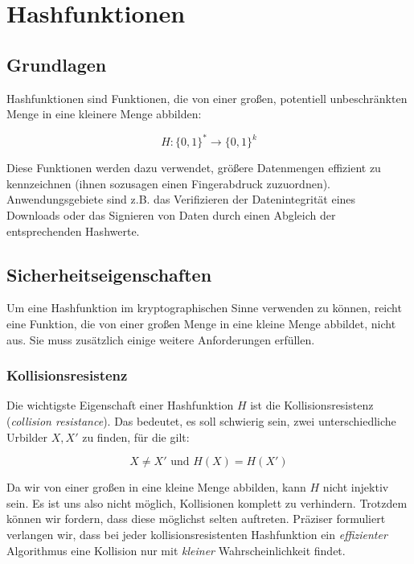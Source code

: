 \chapter{Hashfunktionen}

\section{Grundlagen}

Hashfunktionen sind Funktionen, die von einer großen, potentiell unbeschränkten Menge in eine kleinere Menge abbilden:

\begin{equation*}
H \colon \{0,1\}^* \rightarrow \{0,1\}^k
\end{equation*}

Diese Funktionen werden dazu verwendet, größere Datenmengen effizient zu kennzeichnen (ihnen sozusagen einen Fingerabdruck zuzuordnen). Anwendungsgebiete sind
z.B. das Verifizieren der Datenintegrität eines Downloads oder das Signieren von Daten durch einen Abgleich der entsprechenden Hashwerte.

\section{Sicherheitseigenschaften}

Um eine Hashfunktion im kryptographischen Sinne verwenden zu können, reicht eine Funktion, die von einer großen Menge in eine kleine Menge abbildet, nicht aus.
Sie muss zusätzlich einige weitere Anforderungen erfüllen.

\subsection{Kollisionsresistenz}
Die wichtigste Eigenschaft einer Hashfunktion $H$ ist die Kollisionsresistenz (\textit{collision resistance}). Das bedeutet, es soll schwierig sein, zwei
unterschiedliche Urbilder $X, X'$ zu finden, für die gilt: 

\begin{equation*}
X \neq X' \text{ und } H(X) = H(X')
\end{equation*}

Da wir von einer großen in eine kleine Menge abbilden, kann $H$ nicht injektiv sein. Es ist uns also nicht möglich, Kollisionen komplett zu verhindern. Trotzdem
können wir fordern, dass diese möglichst selten auftreten. Präziser formuliert verlangen wir, dass bei jeder kollisionsresistenten Hashfunktion ein \emph{effizienter}
Algorithmus eine Kollision nur mit \emph{kleiner} Wahrscheinlichkeit findet.

